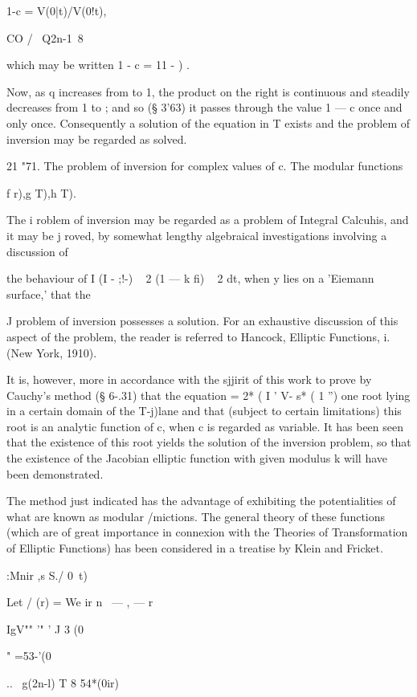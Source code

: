 1-c = V(0|t)/V(0!t), 

CO /  \  Q2n-1\ 8 

which may be written 1 - c = 11  - ) . 

Now, as q increases from to 1, the product on the right is continuous 
and steadily decreases from 1 to ; and so (§ 3'63) it passes through the 
value 1 — c once and only once. Consequently a solution of the equation 
in T exists and the problem of inversion may be regarded as solved. 

21 "71. The problem of inversion for complex values of c. The modular functions 

f r),g T),h T). 

The i roblem of inversion may be regarded as a problem of Integral Calcuhis, and it 
may be j roved, by somewhat lengthy algebraical investigations involving a discussion of 

the behaviour of I (I - ;!-) ~ 2 (1 — k fi) ~ 2 dt, when y lies on a 'Eiemann surface,' that the 

J 
problem of inversion possesses a solution. For an exhaustive discussion of this aspect of 
the problem, the reader is referred to Hancock, Elliptic Functions, i. (New York, 1910). 

It is, however, more in accordance with the sjjirit of this work to prove by Cauchy's 
method (§ 6-.31) that the equation =  2* (  I ' V- s* (  1 '')    one root lying in a certain 
domain of the T-j)lane and that (subject to certain limitations) this root is an analytic 
function of c, when c is regarded as variable. It has been seen that the existence of this 
root yields the solution of the inversion problem, so that the existence of the Jacobian 
elliptic function with given modulus k will have been demonstrated. 

The method just indicated has the advantage of exhibiting the potentialities of what 
are known as modular /mictions. The general theory of these functions (which are of 
great importance in connexion with the Theories of Transformation of Elliptic Functions) 
has been considered in a treatise by Klein and Fricket. 

:Mnir ,s S./ 0\ t) 



Let   / (r) = We ir n \ —  , — r  \ 



IgV""   '" ' J  3 (0 

" =53-'(0 



..  \ g(2n-l) T 8 54*(0ir) 



